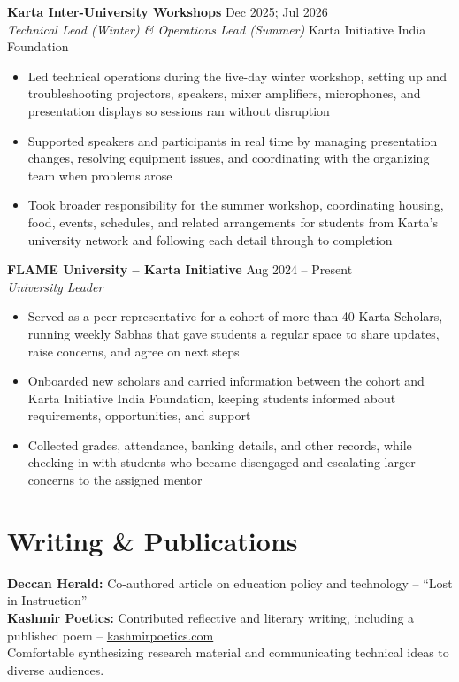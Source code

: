 \documentclass[10pt,a4paper]{article}
\newcommand{\experience}[4]{
    \textbf{#1} \hfill #2\\
    \textit{#3} \hfill #4\\[0.1em]
}
\begin{document}
\experience{Karta Inter-University Workshops}{Dec 2025; Jul 2026}{Technical Lead (Winter) \& Operations Lead (Summer)}{Karta Initiative India Foundation}
\begin{itemize}[leftmargin=*, itemsep=0pt, parsep=0pt, topsep=1pt]
    \item Led technical operations during the five-day winter workshop, setting up and troubleshooting projectors, speakers, mixer amplifiers, microphones, and presentation displays so sessions ran without disruption
    \item Supported speakers and participants in real time by managing presentation changes, resolving equipment issues, and coordinating with the organizing team when problems arose
    \item Took broader responsibility for the summer workshop, coordinating housing, food, events, schedules, and related arrangements for students from Karta's university network and following each detail through to completion
\end{itemize}

\experience{FLAME University -- Karta Initiative}{Aug 2024 -- Present}{University Leader}{}
\begin{itemize}[leftmargin=*, itemsep=0pt, parsep=0pt, topsep=1pt]
    \item Served as a peer representative for a cohort of more than 40 Karta Scholars, running weekly Sabhas that gave students a regular space to share updates, raise concerns, and agree on next steps
    \item Onboarded new scholars and carried information between the cohort and Karta Initiative India Foundation, keeping students informed about requirements, opportunities, and support
    \item Collected grades, attendance, banking details, and other records, while checking in with students who became disengaged and escalating larger concerns to the assigned mentor
\end{itemize}

\section*{Writing \& Publications}

\textbf{Deccan Herald:} Co-authored article on education policy and technology -- ``Lost in Instruction''\\
\textbf{Kashmir Poetics:} Contributed reflective and literary writing, including a published poem -- \href{https://kashmirpoetics.com}{kashmirpoetics.com}\\
Comfortable synthesizing research material and communicating technical ideas to diverse audiences.
\end{document}
